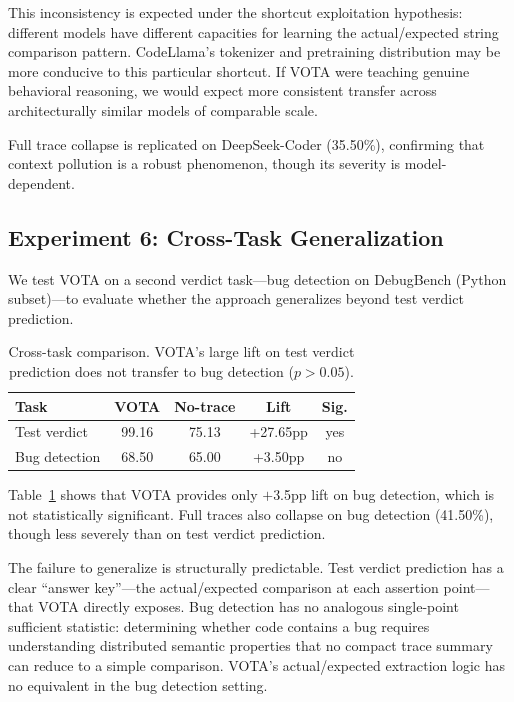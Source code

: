 \documentclass[11pt,a4paper]{article}
\begin{document}
This inconsistency is expected under the shortcut exploitation hypothesis: different models have different capacities for learning the actual/expected string comparison pattern. CodeLlama's tokenizer and pretraining distribution may be more conducive to this particular shortcut. If VOTA were teaching genuine behavioral reasoning, we would expect more consistent transfer across architecturally similar models of comparable scale.

Full trace collapse is replicated on DeepSeek-Coder (35.50\%), confirming that context pollution is a robust phenomenon, though its severity is model-dependent.

\subsection{Experiment 6: Cross-Task Generalization}
\label{sec:exp6}

We test VOTA on a second verdict task---bug detection on DebugBench (Python subset)---to evaluate whether the approach generalizes beyond test verdict prediction.

\begin{table}[t]
\centering
\small
\begin{tabular}{lcccc}
\toprule
\textbf{Task} & \textbf{VOTA} & \textbf{No-trace} & \textbf{Lift} & \textbf{Sig.} \\
\midrule
Test verdict & 99.16 & 75.13 & +27.65pp & yes \\
Bug detection & 68.50 & 65.00 & +3.50pp & no \\
\bottomrule
\end{tabular}
\caption{Cross-task comparison. VOTA's large lift on test verdict prediction does not transfer to bug detection ($p > 0.05$).}
\label{tab:cross_task}
\end{table}

Table~\ref{tab:cross_task} shows that VOTA provides only $+$3.5pp lift on bug detection, which is not statistically significant. Full traces also collapse on bug detection (41.50\%), though less severely than on test verdict prediction.

The failure to generalize is structurally predictable. Test verdict prediction has a clear ``answer key''---the actual/expected comparison at each assertion point---that VOTA directly exposes. Bug detection has no analogous single-point sufficient statistic: determining whether code contains a bug requires understanding distributed semantic properties that no compact trace summary can reduce to a simple comparison. VOTA's actual/expected extraction logic has no equivalent in the bug detection setting.
\end{document}
